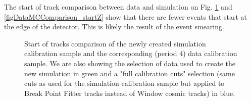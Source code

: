 The start of track comparison between data and simulation on Fig. \ref{figDataMCComparison_startXstartY} and \ref{figDataMCComparison_startZ} show that there are fewer events that start at the edge of the detector. This is likely the result of the event smearing.

\begin{figure}[!ht]

\caption{Start of tracks comparison of the newly created simulation calibration sample and the corresponding (period 4) data calibration sample. We are also showing the selection of data used to create the new simulation in green and a "full calibration cuts" selection (same cuts as used for the simulation calibration sample but applied to Break Point Fitter tracks instead of Window cosmic tracks) in blue.}
\label{figDataMCComparison_startXstartY}
\end{figure}


